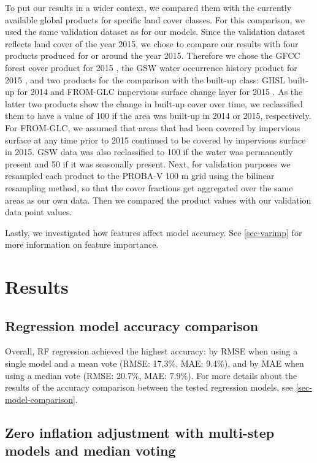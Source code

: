 \documentclass[review,authoryear,3p]{elsarticle}
\begin{document}
To put our results in a wider context, we compared them with the currently available global products for specific land cover classes.
For this comparison, we used the same validation dataset as for our models.
Since the validation dataset reflects land cover of the year 2015, we chose to compare our results with four products produced for or around the year 2015.
Therefore we chose the \gls{GFCC} forest cover product for 2015 \citep{townshend_global_2017}, the \gls{GSW} water occurrence history product for 2015 \citep{pekel_high-resolution_2016}, and two products for the comparison with the built-up class: \gls{GHSL} built-up for 2014 \citep{corbane_automated_2019} and \gls{FROM-GLC} impervious surface change layer for 2015 \citep{gong_annual_2020}.
As the latter two products show the change in built-up cover over time, we reclassified them to have a value of 100 if the area was built-up in 2014 or 2015, respectively.
For \gls{FROM-GLC}, we assumed that areas that had been covered by impervious surface at any time prior to 2015 continued to be covered by impervious surface in 2015.
\gls{GSW} data was also reclassified to 100 if the water was permanently present and 50 if it was seasonally present.
Next, for validation purposes we resampled each product to the PROBA-V 100 m grid using the bilinear resampling method, so that the cover fractions get aggregated over the same areas as our own data.
Then we compared the product values with our validation data point values.

Lastly, we investigated how features affect model accuracy. See \ref{sec-varimp} for more information on feature importance.

\section{Results}

\subsection{Regression model accuracy comparison}

Overall, \gls{RF} regression achieved the highest accuracy: by \gls{RMSE} when using a single model and a mean vote (\gls{RMSE}: 17.3\%, \gls{MAE}: 9.4\%), and by \gls{MAE} when using a median vote (\gls{RMSE}: 20.7\%, MAE: 7.9\%).
For more details about the results of the accuracy comparison between the tested regression models, see \ref{sec-model-comparison}.

\subsection{Zero inflation adjustment with multi-step models and median voting}
\end{document}
